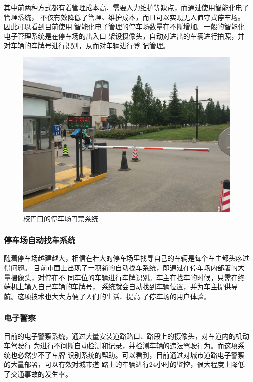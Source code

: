 其中前两种方式都有着管理成本高、需要人力维护等缺点，而通过使用智能化电子管理系统，
不仅有效降低了管理、维护成本，而且可以实现无人值守式停车场。因此可以看到目前使用
智能化电子管理的停车场数量在不断增加。一般的智能化电子管理系统是在停车场的出入口
架设摄像头，自动对进出的车辆进行拍照，并对车辆的车牌号进行识别，从而对车辆进行登
记管理。

\begin{figure}[ht]
  \centering
  \includegraphics[width=1.0\linewidth]{./Figure/ParkingSystem.jpg}
  \caption{校门口的停车场门禁系统}
\end{figure}

\subsubsection{停车场自动找车系统}

随着停车场越建越大，相信在若大的停车场里找寻自己的车辆是每个车主都头疼过得问题。
目前市面上出现了一项新的自动找车系统，即通过在停车场内部署的大量摄像头，对停在不
同车位的车辆进行车牌识别。车主在找车的时候，只需在终端机上输入自己车辆的车牌号，
系统就会自动找到车辆位置，并为车主提供导航。这项技术也大大方便了人们的生活、提高
了停车场的用户体验。

\subsubsection{电子警察}

目前的电子警察系统，通过大量安装道路路口、路段上的摄像头，对车道内的机动车驾驶行
为进行不间断自动检测和记录，并检测车辆的违法驾驶行为。而这项系统也必然少不了车牌
识别系统的帮助。可以看到，目前通过对城市道路电子警察的大量部署，可以有效对城市道
路上的车辆进行24小时的监控，很大程度上降低了交通事故的发生率。

